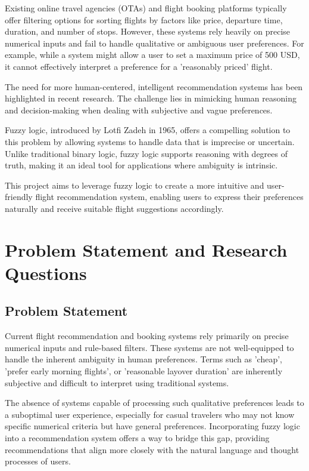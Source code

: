 \documentclass[a4paper]{article}
\begin{document}
Existing online travel agencies (OTAs) and flight booking platforms typically offer filtering options for sorting flights by factors like price, departure time, duration, and number of stops. However, these systems rely heavily on precise numerical inputs and fail to handle qualitative or ambiguous user preferences. For example, while a system might allow a user to set a maximum price of 500 USD, it cannot effectively interpret a preference for a 'reasonably priced' flight.

The need for more human-centered, intelligent recommendation systems has been highlighted in recent research. The challenge lies in mimicking human reasoning and decision-making when dealing with subjective and vague preferences.

Fuzzy logic, introduced by Lotfi Zadeh in 1965, offers a compelling solution to this problem by allowing systems to handle data that is imprecise or uncertain. Unlike traditional binary logic, fuzzy logic supports reasoning with degrees of truth, making it an ideal tool for applications where ambiguity is intrinsic.

This project aims to leverage fuzzy logic to create a more intuitive and user-friendly flight recommendation system, enabling users to express their preferences naturally and receive suitable flight suggestions accordingly.

\section{Problem Statement and Research Questions}
\subsection{Problem Statement}
Current flight recommendation and booking systems rely primarily on precise numerical inputs and rule-based filters. These systems are not well-equipped to handle the inherent ambiguity in human preferences. Terms such as 'cheap', 'prefer early morning flights', or 'reasonable layover duration' are inherently subjective and difficult to interpret using traditional systems.

The absence of systems capable of processing such qualitative preferences leads to a suboptimal user experience, especially for casual travelers who may not know specific numerical criteria but have general preferences. Incorporating fuzzy logic into a recommendation system offers a way to bridge this gap, providing recommendations that align more closely with the natural language and thought processes of users.
\end{document}
